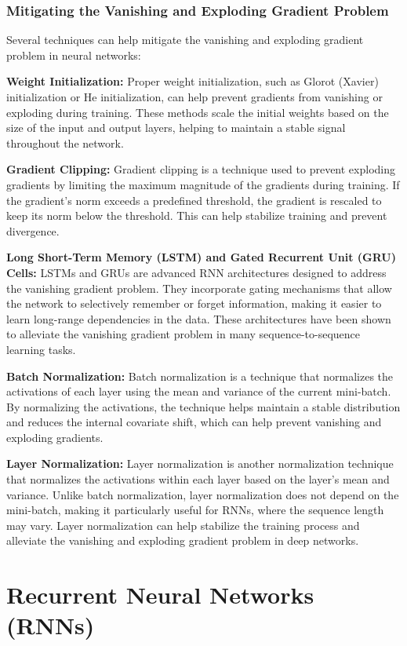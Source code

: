 \documentclass[12pt]{article}
\begin{document}
\subsubsection{Mitigating the Vanishing and Exploding Gradient Problem}

Several techniques can help mitigate the vanishing and exploding gradient problem in neural networks:

\textbf{Weight Initialization:} Proper weight initialization, such as Glorot (Xavier) initialization or He initialization, can help prevent gradients from vanishing or exploding during training. These methods scale the initial weights based on the size of the input and output layers, helping to maintain a stable signal throughout the network.

\textbf{Gradient Clipping:} Gradient clipping is a technique used to prevent exploding gradients by limiting the maximum magnitude of the gradients during training. If the gradient's norm exceeds a predefined threshold, the gradient is rescaled to keep its norm below the threshold. This can help stabilize training and prevent divergence.

\textbf{Long Short-Term Memory (LSTM) and Gated Recurrent Unit (GRU) Cells:} LSTMs and GRUs are advanced RNN architectures designed to address the vanishing gradient problem. They incorporate gating mechanisms that allow the network to selectively remember or forget information, making it easier to learn long-range dependencies in the data. These architectures have been shown to alleviate the vanishing gradient problem in many sequence-to-sequence learning tasks.

\textbf{Batch Normalization:} Batch normalization is a technique that normalizes the activations of each layer using the mean and variance of the current mini-batch. By normalizing the activations, the technique helps maintain a stable distribution and reduces the internal covariate shift, which can help prevent vanishing and exploding gradients.

\textbf{Layer Normalization:} Layer normalization is another normalization technique that normalizes the activations within each layer based on the layer's mean and variance. Unlike batch normalization, layer normalization does not depend on the mini-batch, making it particularly useful for RNNs, where the sequence length may vary. Layer normalization can help stabilize the training process and alleviate the vanishing and exploding gradient problem in deep networks.


\section{Recurrent Neural Networks (RNNs)}
\end{document}
